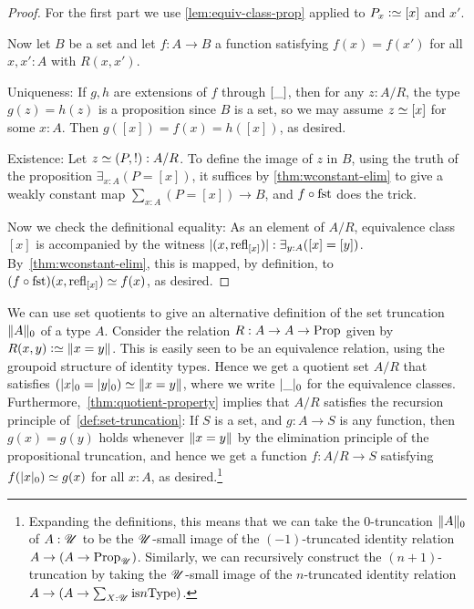\begin{proof}
  For the first part we use \cref{lem:equiv-class-prop} applied to $P_x \defeq [x]$ and $x'$.

  Now let $B$ be a set and let $f : A \to B$ a function satisfying $f(x)=f(x')$
  for all $x,x':A$ with $R(x,x')$.

  Uniqueness: If $g,h$ are extensions of $f$ through $[\_]$, then
  for any $z:A/R$, the type $g(z)=h(z)$ is a proposition since $B$ is
  a set, so we may assume $z\jdeq [x]$ for some $x:A$. Then
  $g([x]) = f(x) = h([x])$, as desired.

  Existence: Let $z\jdeq(P,!):A/R$. To define the image of $z$ in $B$,
  using the truth of the proposition $\exists_{x:A}(P = [x])$,
  it suffices by \cref{thm:wconstant-elim}
  to give a weakly constant map $\sum_{x:A}(P = [x]) \to B$,
  and $f \circ \fst$ does the trick.

  Now we check the definitional equality: As an element of $A/R$,
  equivalence class $[x]$ is accompanied by the witness
  $\lvert(x, \mathrm{refl}_{[x]})\rvert : \exists_{y:A}([x] = [y])$.
  By~\cref{thm:wconstant-elim}, this is mapped, by definition,
  to $(f \circ \fst)(x, \refl{[x]}) \jdeq f(x)$, as desired.
\end{proof}

We can use set quotients to give an alternative definition
of the set truncation $\lVert A\rVert_0$ of a type $A$.
Consider the relation $R : A \to A \to \mathrm{Prop}$ given by
$R(x,y) \defeq \Trunc{x=y}$.
This is easily seen to be an equivalence relation,
using the groupoid structure of identity types.
Hence we get a quotient set $A/R$ that satisfies
$(\lvert x\rvert_0 = \lvert y\rvert_0) \simeq \lVert x=y\rVert$,
where we write $\lvert\_\rvert_0$ for the equivalence classes.
Furthermore,~\cref{thm:quotient-property} implies that
$A/R$ satisfies the recursion principle of~\cref{def:set-truncation}:
If $S$ is a set, and $g:A\to S$ is any function,
then $g(x)=g(y)$ holds whenever $\lVert x=y\rVert$
by the elimination principle
of the propositional truncation,
and hence we get a function $f : A/R \to S$ satisfying
$f(\trunc{x}_0)\jdeq g(x)$ for all $x:A$, as desired.\footnote{%
  Expanding the definitions,
  this means that we can take the $0$-truncation $\lVert A\rVert_0$
  of $A:{\mathscr{U}}$ to be the ${\mathscr{U}}$-small image
  of the $(-1)$-truncated identity relation
  $A \to (A \to \mathrm{Prop}_{\mathscr{U}})$.
  Similarly, we can recursively construct the $(n+1)$-truncation
  by taking the ${\mathscr{U}}$-small image
  of the $n$-truncated identity relation
  $A \to (A \to \sum_{X:{\mathscr{U}}}\mathrm{is}{n}\mathrm{Type})$.}


